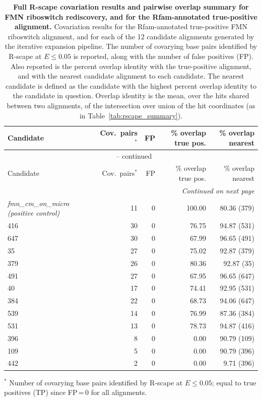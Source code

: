 \begingroup
\footnotesize
\begin{longtable}{p{}rrrr}
\caption[Full covariation results for FMN Riboswitch rediscovery]{\textbf{Full R-scape covariation results and pairwise overlap summary for FMN riboswitch rediscovery, and for the Rfam-annotated true-positive alignment.}
    Covariation results for the Rfam-annotated true-positive FMN riboswitch alignment, and for each of the 12 candidate alignments generated by the iterative expansion pipeline.
    The number of covarying base pairs identified by R-scape at $E \le 0.05$ is reported, along with the number of false positives (FP).
    Also reported is the percent overlap identity with the true-positive alignment, and with the nearest candidate alignment to each candidate.
    The nearest candidate is defined as the candidate with the highest percent overlap identity to the candidate in question.
    Overlap identity is the mean, over the hits shared between two alignments, of the intersection over union of the hit coordinates (as in Table~\ref{tab:rscape_summary}).}
\label{tab:rscape_appendix} \\
\hline
Candidate & Cov.\ pairs$^{*}$ & FP & \% overlap true pos. & \% overlap nearest \\
\hline
\endfirsthead
\multicolumn{5}{c}{\tablename\ \thetable{} -- continued} \\
\hline
Candidate & Cov.\ pairs$^{*}$ & FP & \% overlap true pos. & \% overlap nearest \\
\hline
\endhead
\hline
\multicolumn{5}{r}{\emph{Continued on next page}} \\
\endfoot
\hline
\endlastfoot
\emph{fmn\_cm\_on\_micro (positive control)} & 11 & 0 & 100.00 & 80.36 (379) \\
416 & 30 & 0 & 76.75 & 94.87 (531) \\
647 & 30 & 0 & 67.99 & 96.65 (491) \\
35  & 27 & 0 & 75.02 & 92.87 (379) \\
379 & 26 & 0 & 80.36 & 92.87 (35) \\
491 & 27 & 0 & 67.95 & 96.65 (647) \\
40  & 17 & 0 & 74.41 & 92.95 (531) \\
384 & 22 & 0 & 68.73 & 94.06 (647) \\
539 & 14 & 0 & 76.99 & 87.36 (384) \\
531 & 13 & 0 & 78.73 & 94.87 (416) \\
396 & 8  & 0 & 0.00 & 90.79 (109) \\
109 & 5  & 0 & 0.00 & 90.79 (396) \\
442 & 2  & 0 & 0.00 & 9.71 (396) \\
\end{longtable}
\endgroup

\vspace{4pt}
\noindent\footnotesize $^{*}$ Number of covarying base pairs identified by R-scape at $E \le 0.05$; equal to true positives (TP) since FP\,=\,0 for all alignments.